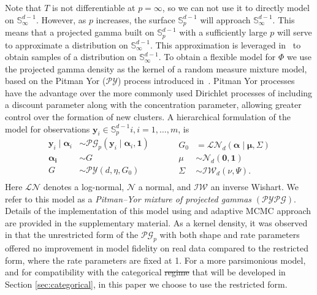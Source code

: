 Note that $T$ is not differentiable at $p = \infty$, so we can not use it to 
    directly model on ${\mathbb S}_{\infty}^{d-1}$. However, as $p$ increases,
    the surface $\mathbb{S}_p^{d-1}$ will approach $\mathbb{S}_{\infty}^{d-1}$.
    This means that a projected gamma built on $\mathbb{S}_p^{d-1}$ with a
    sufficiently large $p$ will serve to approximate a distribution on 
    $\mathbb{S}_{\infty}^{d-1}$.  This approximation is leveraged 
    in~\cite{trubey:pg} to obtain samples of a distribution on 
    ${\mathbb S}_{\infty}^{d-1}$. To obtain a flexible model for $\Phi$ we use 
    the projected gamma density as the kernel of a random measure mixture model, 
    based on the Pitman Yor ($\mathcal{PY}$) process introduced 
    in~\cite{perman1992}. Pitman Yor processes have the advantage over the more 
    commonly used Dirichlet processes \citep{Ferguson74} of including a 
    discount parameter along with the concentration parameter, allowing greater 
    control over the formation of new clusters.  A hierarchical formulation of 
    the model for observations 
    $\bm{y}_i\in \mathbb{S}_{p}^{d-1}i, i=1, \ldots,m$, is
    \begin{equation}
        \label{eqn:modelsphere}
        \begin{aligned}
        \bm{y}_i \mid \bm{\alpha}_i &\sim \mathcal{PG}_p
                \left(\bm{y}_i\mid\bm{\alpha}_i, \bm{1}\right)\\
        \bm{\alpha_i} &\sim G\\
        G &\sim \mathcal{PY}\left(d, \eta, G_0\right)\\
        \end{aligned}
        ~\hspace{1cm}
        \begin{aligned}
        G_0 &= \mathcal{LN}_d\left(\bm{\alpha}\mid\bm{\mu},\Sigma\right)\\
        \mu &\sim \mathcal{N}_d\left(\bm{0},\bm{1}\right)\\
        \Sigma &\sim \mathcal{IW}_d\left(\nu, \Psi\right).
        \end{aligned}
    \end{equation}
    Here $\mathcal{LN}$ denotes a log-normal, $\mathcal{N}$ a normal, and 
    $\mathcal{IW}$ an inverse Wishart.  We refer to this model as a
    \emph{Pitman--Yor mixture of projected gammas} $(\mathcal{PYPG})$.
    Details of the implementation of this 
    model using and adaptive MCMC approach are provided in the supplementary 
    material.  As a kernel density, it was observed in \cite{trubey:pg} that 
    the unrestricted form of the $\mathcal{PG}_p$ with both shape and rate 
    parameters offered no improvement in model fidelity on real data compared to 
    the restricted form, where the rate parameters are fixed at 1.  For a more 
    parsimonious model, and for compatibility with the categorical \st{regime}
    that will be developed in Section \ref{sec:categorical}, in 
    this paper we choose to use the restricted form.

